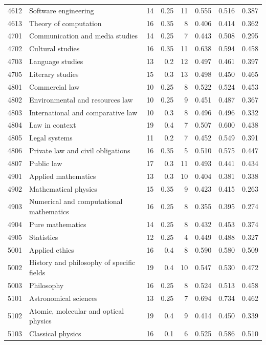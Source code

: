 \begin{longtable}{r p{3.35cm} rr r rrr}
4612 & Software engineering & 14 & 0.25 & 11 & 0.555 & 0.516 & 0.387 \\
4613 & Theory of computation & 16 & 0.35 & 8 & 0.406 & 0.414 & 0.362 \\
4701 & Communication and media studies & 14 & 0.25 & 7 & 0.443 & 0.508 & 0.295 \\
4702 & Cultural studies & 16 & 0.35 & 11 & 0.638 & 0.594 & 0.458 \\
4703 & Language studies & 13 & 0.2 & 12 & 0.497 & 0.461 & 0.397 \\
4705 & Literary studies & 15 & 0.3 & 13 & 0.498 & 0.450 & 0.465 \\
4801 & Commercial law & 10 & 0.25 & 8 & 0.522 & 0.524 & 0.453 \\
4802 & Environmental and resources law & 10 & 0.25 & 9 & 0.451 & 0.487 & 0.367 \\
4803 & International and comparative law & 10 & 0.3 & 8 & 0.496 & 0.496 & 0.332 \\
4804 & Law in context & 19 & 0.4 & 7 & 0.507 & 0.600 & 0.438 \\
4805 & Legal systems & 11 & 0.2 & 7 & 0.452 & 0.549 & 0.391 \\
4806 & Private law and civil obligations & 16 & 0.35 & 5 & 0.510 & 0.575 & 0.447 \\
4807 & Public law & 17 & 0.3 & 11 & 0.493 & 0.441 & 0.434 \\
4901 & Applied mathematics & 13 & 0.3 & 10 & 0.404 & 0.381 & 0.338 \\
4902 & Mathematical physics & 15 & 0.35 & 9 & 0.423 & 0.415 & 0.263 \\
4903 & Numerical and computational mathematics & 16 & 0.25 & 8 & 0.355 & 0.395 & 0.274 \\
4904 & Pure mathematics & 14 & 0.25 & 8 & 0.432 & 0.453 & 0.374 \\
4905 & Statistics & 12 & 0.25 & 4 & 0.449 & 0.488 & 0.327 \\
5001 & Applied ethics & 16 & 0.4 & 8 & 0.590 & 0.580 & 0.509 \\
5002 & History and philosophy of specific fields & 19 & 0.4 & 10 & 0.547 & 0.530 & 0.472 \\
5003 & Philosophy & 16 & 0.25 & 8 & 0.524 & 0.513 & 0.458 \\
5101 & Astronomical sciences & 13 & 0.25 & 7 & 0.694 & 0.734 & 0.462 \\
5102 & Atomic, molecular and optical physics & 19 & 0.4 & 9 & 0.414 & 0.450 & 0.339 \\
5103 & Classical physics & 16 & 0.1 & 6 & 0.525 & 0.586 & 0.510 \\

\end{longtable}
